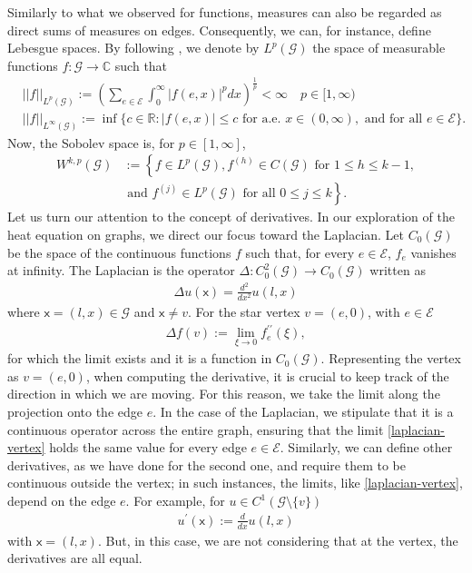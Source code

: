\documentclass[11pt,a4paper]{article}
\theoremstyle{plain}
\theoremstyle{definition}
\theoremstyle{remark}
\begin{document}
		
		Similarly to what we observed for functions, measures can also be regarded as direct sums of measures on edges. Consequently, we can, for instance, define Lebesgue spaces. By following \cite[Definition 3.15]{mugnolo-libro}, we denote by $L^p(\mathcal{G})$ the space of measurable functions $f: \mathcal{G} \to \mathbb{C}$ such that
		\begin{align*}
			&\vert \vert f \vert \vert_{L^p(\mathcal{G})} :=\left(\sum_{e\in \mathcal{E}} \int_0^\infty \vert f(e,x)\vert^p dx\right)^\frac{1}{p}<\infty \quad p\in [1,\infty)\\
			&\vert \vert f \vert \vert_{L^\infty(\mathcal{G})}:=\inf \{c \in \mathbb{R}: \vert f(e,x)\vert \leq c \text{ for a.e. } x\in (0,\infty), \text{ and for all }e \in \mathcal{E}  \}.
		\end{align*}
		Now, the Sobolev space is, for $ p\in [1,\infty]$,
		\begin{align*}
			W^{k,p}(\mathcal{G})&:=\left\{f \in L^p(\mathcal{G}), f^{(h)} \in C(\mathcal{G}) \text{ for } 1 \leq h \leq k-1,\right.\\
			&\left. \text{ and } f^{(j)} \in L^p(\mathcal{G}) \text{ for all } 0 \leq j \leq k \right\}.
		\end{align*}
		Let us turn our attention to the concept of derivatives. In our exploration of the heat equation on graphs, we direct our focus toward the Laplacian.
		Let $C_0(\mathcal{G})$ be the space of the continuous functions $f$ such that, for every $e \in \mathcal{E}$, $f_e$ vanishes at infinity. The Laplacian is the operator $\Delta: C^2_0(\mathcal{G}) \to C_0(\mathcal{G})$ written as
		\begin{align}
			\label{laplacian}
			\Delta u (\mathsf{x})= \frac{d^2}{dx^2} u(l,x)
		\end{align}
		where $\mathsf{x}=(l,x) \in \mathcal{G}$ and $\mathsf{x}\ne v$. For the star vertex $v=(e,0)$, with  $e \in \mathcal{E}$
		\begin{align}
			\label{laplacian-vertex}
			\Delta f(v):=\lim_{\xi \to 0} f^{\prime \prime}_e(\xi),
		\end{align}
		for which the limit exists and it is a function in $C_0(\mathcal{G})$. Representing the vertex as $v=(e,0)$, when computing the derivative, it is crucial to keep track of the direction in which we are moving. For this reason, we take the limit along the projection onto the edge $e$. In the case of the Laplacian, we stipulate that it is a continuous operator across the entire graph, ensuring that the limit \eqref{laplacian-vertex} holds the same value for every edge $e \in \mathcal{E}$. Similarly, we can define other derivatives, as we have done for the second one, and require them to be continuous outside the vertex; in such instances, the limits, like \eqref{laplacian-vertex}, depend on the edge $e$. For example, for $u \in C^1(\mathcal{G} \setminus \{v\})$
		\begin{align*}
			u^\prime (\mathsf{x}):=\frac{d}{dx} u(l,x)
		\end{align*}
		with $\mathsf{x}=(l,x)$. 
		But, in this case, we are not considering that at the vertex, the derivatives are all equal.
\end{document}
